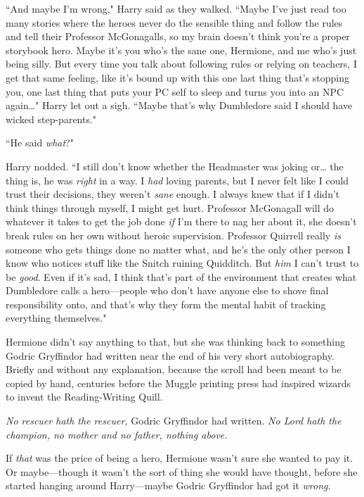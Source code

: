``And maybe I'm wrong," Harry said as they walked. ``Maybe I've just read too many stories where the heroes never do the sensible thing and follow the rules and tell their Professor McGonagalls, so my brain doesn't think you're a proper storybook hero. Maybe it's you who's the sane one, Hermione, and me who's just being silly. But every time you talk about following rules or relying on teachers, I get that same feeling, like it's bound up with this one last thing that's stopping you, one last thing that puts your PC self to sleep and turns you into an NPC again{\ldots}" Harry let out a sigh. ``Maybe that's why Dumbledore said I should have wicked step-parents."

``He said \emph{what}?"

Harry nodded. ``I still don't know whether the Headmaster was joking or{\ldots} the thing is, he was \emph{right} in a way. I \emph{had} loving parents, but I never felt like I could trust their decisions, they weren't \emph{sane} enough. I always knew that if I didn't think things through myself, I might get hurt. Professor McGonagall will do whatever it takes to get the job done \emph{if} I'm there to nag her about it, she doesn't break rules on her own without heroic supervision. Professor Quirrell really \emph{is} someone who gets things done no matter what, and he's the only other person I know who notices stuff like the Snitch ruining Quidditch. But \emph{him} I can't trust to be \emph{good}. Even if it's sad, I think that's part of the environment that creates what Dumbledore calls a hero—people who don't have anyone else to shove final responsibility onto, and that's why they form the mental habit of tracking everything themselves."

Hermione didn't say anything to that, but she was thinking back to something Godric Gryffindor had written near the end of his very short autobiography. Briefly and without any explanation, because the scroll had been meant to be copied by hand, centuries before the Muggle printing press had inspired wizards to invent the Reading-Writing Quill.

\emph{No rescuer hath the rescuer,} Godric Gryffindor had written. \emph{No Lord hath the champion, no mother and no father, nothing above.}

If \emph{that} was the price of being a hero, Hermione wasn't sure she wanted to pay it. Or maybe—though it wasn't the sort of thing she would have thought, before she started hanging around Harry—maybe Godric Gryffindor had got it \emph{wrong}.

